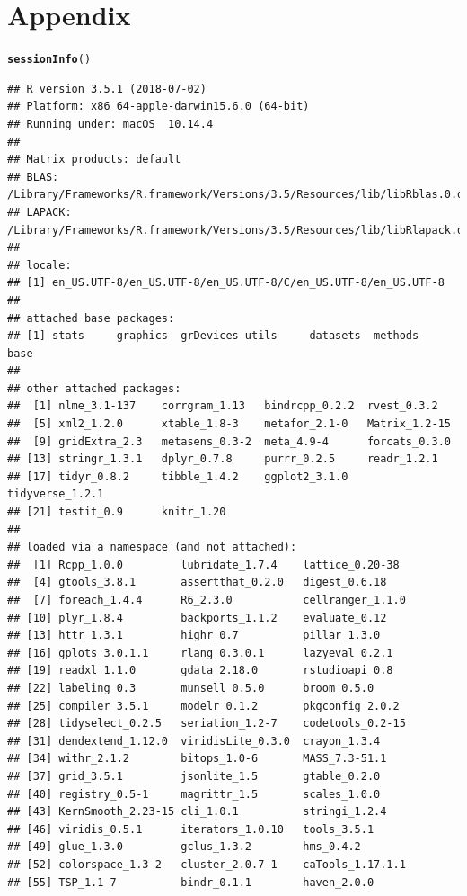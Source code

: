\documentclass[11pt,a4paper,twoside]{book}\usepackage[]{graphicx}\usepackage[]{color}
\makeatletter
\newcommand{\hlstd}[1]{\textcolor[rgb]{0.345,0.345,0.345}{#1}}%
\newcommand{\hlkwd}[1]{\textcolor[rgb]{0.737,0.353,0.396}{\textbf{#1}}}%
\newenvironment{kframe}{%
 \def\at@end@of@kframe{}%
 \ifinner\ifhmode%
  \def\at@end@of@kframe{\end{minipage}}%
  \begin{minipage}{\columnwidth}%
 \fi\fi%
 \def\FrameCommand##1{\hskip\@totalleftmargin \hskip-\fboxsep
 \colorbox{shadecolor}{##1}\hskip-\fboxsep
     \hskip-\linewidth \hskip-\@totalleftmargin \hskip\columnwidth}%
 \MakeFramed {\advance\hsize-\width
   \@totalleftmargin\z@ \linewidth\hsize
   \@setminipage}}%
 {\par\unskip\endMakeFramed%
 \at@end@of@kframe}
\newenvironment{knitrout}{}{} %
\makeatother
\begin{document}

\appendix




\chapter{Appendix}

\begin{knitrout}
\color{fgcolor}\begin{kframe}
\begin{alltt}
\hlkwd{sessionInfo}\hlstd{()}
\end{alltt}
\begin{verbatim}
## R version 3.5.1 (2018-07-02)
## Platform: x86_64-apple-darwin15.6.0 (64-bit)
## Running under: macOS  10.14.4
## 
## Matrix products: default
## BLAS: /Library/Frameworks/R.framework/Versions/3.5/Resources/lib/libRblas.0.dylib
## LAPACK: /Library/Frameworks/R.framework/Versions/3.5/Resources/lib/libRlapack.dylib
## 
## locale:
## [1] en_US.UTF-8/en_US.UTF-8/en_US.UTF-8/C/en_US.UTF-8/en_US.UTF-8
## 
## attached base packages:
## [1] stats     graphics  grDevices utils     datasets  methods   base     
## 
## other attached packages:
##  [1] nlme_3.1-137    corrgram_1.13   bindrcpp_0.2.2  rvest_0.3.2    
##  [5] xml2_1.2.0      xtable_1.8-3    metafor_2.1-0   Matrix_1.2-15  
##  [9] gridExtra_2.3   metasens_0.3-2  meta_4.9-4      forcats_0.3.0  
## [13] stringr_1.3.1   dplyr_0.7.8     purrr_0.2.5     readr_1.2.1    
## [17] tidyr_0.8.2     tibble_1.4.2    ggplot2_3.1.0   tidyverse_1.2.1
## [21] testit_0.9      knitr_1.20     
## 
## loaded via a namespace (and not attached):
##  [1] Rcpp_1.0.0         lubridate_1.7.4    lattice_0.20-38   
##  [4] gtools_3.8.1       assertthat_0.2.0   digest_0.6.18     
##  [7] foreach_1.4.4      R6_2.3.0           cellranger_1.1.0  
## [10] plyr_1.8.4         backports_1.1.2    evaluate_0.12     
## [13] httr_1.3.1         highr_0.7          pillar_1.3.0      
## [16] gplots_3.0.1.1     rlang_0.3.0.1      lazyeval_0.2.1    
## [19] readxl_1.1.0       gdata_2.18.0       rstudioapi_0.8    
## [22] labeling_0.3       munsell_0.5.0      broom_0.5.0       
## [25] compiler_3.5.1     modelr_0.1.2       pkgconfig_2.0.2   
## [28] tidyselect_0.2.5   seriation_1.2-7    codetools_0.2-15  
## [31] dendextend_1.12.0  viridisLite_0.3.0  crayon_1.3.4      
## [34] withr_2.1.2        bitops_1.0-6       MASS_7.3-51.1     
## [37] grid_3.5.1         jsonlite_1.5       gtable_0.2.0      
## [40] registry_0.5-1     magrittr_1.5       scales_1.0.0      
## [43] KernSmooth_2.23-15 cli_1.0.1          stringi_1.2.4     
## [46] viridis_0.5.1      iterators_1.0.10   tools_3.5.1       
## [49] glue_1.3.0         gclus_1.3.2        hms_0.4.2         
## [52] colorspace_1.3-2   cluster_2.0.7-1    caTools_1.17.1.1  
## [55] TSP_1.1-7          bindr_0.1.1        haven_2.0.0
\end{verbatim}
\end{kframe}
\end{knitrout}
\end{document}

